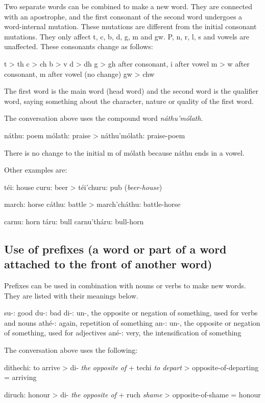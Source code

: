 Two separate words can be combined to make a new word. They are connected with an apostrophe, and the first consonant of the second word undergoes a word-internal mutation. These mutations are different from the initial consonant mutations. They only affect t, c, b, d, g, m and gw. P, n, r, l, s and vowels are unaffected. These consonants change as follows:

t > th
c > ch
b > v
d > dh
g > gh after consonant, i after vowel
m > w after consonant, m after vowel (no change)
gw > chw

The first word is the main word (head word) and the second word is the qualifier word, saying something about the character, nature or quality of the first word.

The conversation above uses the compound word \textit{n\'{a}thu'm\'{o}lath}.

n\'{a}thu: poem
m\'{o}lath: praise
> n\'{a}thu'm\'{o}lath: praise-poem

There is no change to the initial m of m\'{o}lath because n\'{a}thu ends in a vowel.

Other examples are:

t\'{e}i: house
curu: beer
> t\'{e}i'churu: pub (\textit{beer-house})

march: horse
c\'{a}thu: battle
> march'ch\'{a}thu: battle-horse

carnu: horn
t\'{a}ru: bull
carnu'th\'{a}ru: bull-horn

\subsection{Use of prefixes (a word or part of a word attached to the front of another word)}

Prefixes can be used in combination with nouns or verbs to make new words. They are listed with their meanings below.

su-: good
du-: bad
di-: un-, the opposite or negation of something, used for verbs and nouns
ath\'{e}-: again, repetition of something
an-: un-, the opposite or negation of something, used for adjectives
an\'{e}-: very, the intensification of something

The conversation above uses the following:

dithechi: to arrive
> di- \textit{the opposite of} + techi \textit{to depart} > opposite-of-departing = arriving

diruch: honour
> di- \textit{the opposite of} + ruch \textit{shame} > opposite-of-shame = honour

